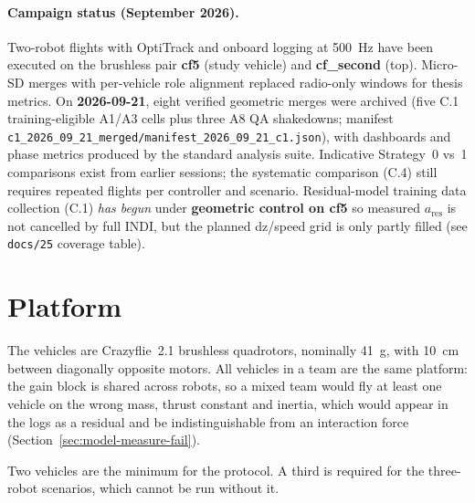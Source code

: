 \paragraph{Campaign status (September 2026).}
Two-robot flights with OptiTrack and onboard logging at \SI{500}{\hertz} have been executed on
the brushless pair \textbf{cf5} (study vehicle) and \textbf{cf\_second} (top). Micro-SD merges
with per-vehicle role alignment replaced radio-only windows for thesis metrics. On
\textbf{2026-09-21}, eight verified geometric merges were archived (five C.1 training-eligible
A1/A3 cells plus three A8 QA shakedowns; manifest
\texttt{c1\_2026\_09\_21\_merged/manifest\_2026\_09\_21\_c1.json}), with dashboards and phase
metrics produced by the standard analysis suite. Indicative Strategy~0 vs~1 comparisons exist from
earlier sessions; the systematic comparison (C.4) still requires repeated flights per controller
and scenario. Residual-model training data collection (C.1) \emph{has begun} under
\textbf{geometric control on cf5} so measured $a_{\mathrm{res}}$ is not cancelled by full INDI,
but the planned dz/speed grid is only partly filled (see \texttt{docs/25} coverage table).

\section{Platform}
\label{sec:setup-platform}

The vehicles are Crazyflie~2.1 brushless quadrotors, nominally \SI{41}{\gram}, with
\SI{10}{\centi\metre} between diagonally opposite motors. All vehicles in a team are the same platform: the gain block
is shared across robots, so a mixed team would fly at least one vehicle on the wrong mass, thrust
constant and inertia, which would appear in the logs as a residual and be indistinguishable from
an interaction force (Section~\ref{sec:model-measure-fail}).

Two vehicles are the minimum for the protocol. A third is required for the three-robot scenarios,
which cannot be run without it.


